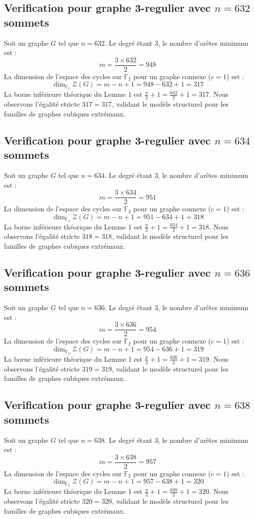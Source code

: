 \documentclass[11pt,a4paper]{article}
\begin{document}
\subsection{Verification pour graphe 3-regulier avec $n=632$ sommets}
Soit un graphe $G$ tel que $n = 632$. Le degré étant 3, le nombre d'arêtes minimum est :
$$ m = \frac{3 \times 632}{2} = 948 $$
La dimension de l'espace des cycles sur $\mathbb{F}_2$ pour un graphe connexe ($c=1$) est :
$$ \dim_{\mathbb{F}_2} \mathcal{Z}(G) = m - n + 1 = 948 - 632 + 1 = 317 $$
La borne inférieure théorique du Lemme 1 est $\frac{n}{2} + 1 = \frac{632}{2} + 1 = 317$.
Nous observons l'égalité stricte $317 = 317$, validant le modèle structurel pour les familles de graphes cubiques extrémaux.

\subsection{Verification pour graphe 3-regulier avec $n=634$ sommets}
Soit un graphe $G$ tel que $n = 634$. Le degré étant 3, le nombre d'arêtes minimum est :
$$ m = \frac{3 \times 634}{2} = 951 $$
La dimension de l'espace des cycles sur $\mathbb{F}_2$ pour un graphe connexe ($c=1$) est :
$$ \dim_{\mathbb{F}_2} \mathcal{Z}(G) = m - n + 1 = 951 - 634 + 1 = 318 $$
La borne inférieure théorique du Lemme 1 est $\frac{n}{2} + 1 = \frac{634}{2} + 1 = 318$.
Nous observons l'égalité stricte $318 = 318$, validant le modèle structurel pour les familles de graphes cubiques extrémaux.

\subsection{Verification pour graphe 3-regulier avec $n=636$ sommets}
Soit un graphe $G$ tel que $n = 636$. Le degré étant 3, le nombre d'arêtes minimum est :
$$ m = \frac{3 \times 636}{2} = 954 $$
La dimension de l'espace des cycles sur $\mathbb{F}_2$ pour un graphe connexe ($c=1$) est :
$$ \dim_{\mathbb{F}_2} \mathcal{Z}(G) = m - n + 1 = 954 - 636 + 1 = 319 $$
La borne inférieure théorique du Lemme 1 est $\frac{n}{2} + 1 = \frac{636}{2} + 1 = 319$.
Nous observons l'égalité stricte $319 = 319$, validant le modèle structurel pour les familles de graphes cubiques extrémaux.

\subsection{Verification pour graphe 3-regulier avec $n=638$ sommets}
Soit un graphe $G$ tel que $n = 638$. Le degré étant 3, le nombre d'arêtes minimum est :
$$ m = \frac{3 \times 638}{2} = 957 $$
La dimension de l'espace des cycles sur $\mathbb{F}_2$ pour un graphe connexe ($c=1$) est :
$$ \dim_{\mathbb{F}_2} \mathcal{Z}(G) = m - n + 1 = 957 - 638 + 1 = 320 $$
La borne inférieure théorique du Lemme 1 est $\frac{n}{2} + 1 = \frac{638}{2} + 1 = 320$.
Nous observons l'égalité stricte $320 = 320$, validant le modèle structurel pour les familles de graphes cubiques extrémaux.
\end{document}
